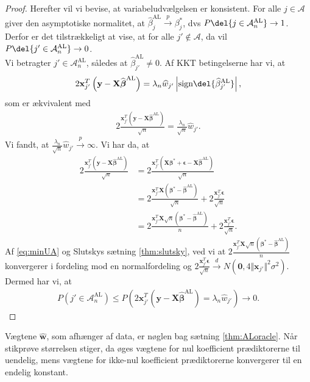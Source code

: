 \begin{proof}
Herefter vil vi bevise, at variabeludvælgelsen er konsistent. For alle $j \in \mathcal{A}$ giver den asymptotiske normalitet, at $\widehat{\beta}_j^{\text{AL}} \overset{p}{\rightarrow}\beta_j^{*}$, dvs $P \del{j \in \mathcal{A}_n^{\text{AL}}} \rightarrow 1$. Derfor er det tilstrækkeligt at vise, at for alle $j' \notin \mathcal{A}$, da vil $P \del{j' \in \mathcal{A}_n^{\text{AL}}} \rightarrow 0$. \\
Vi betragter $j' \in \mathcal{A}_n^{\text{AL}}$, således at $\widehat{\beta}_{j'}^{\text{AL}} \neq 0$. Af KKT betingelserne har vi, at 
\begin{align*}
2 \mathbf{x}_{j'}^T  \left( \mathbf{y}-\mathbf{X}\widehat{\boldsymbol{\beta}}^{\text{AL}} \right)=\lambda_n \widehat{w}_{j'} \left\vert \text{sign} \del{\widehat{\beta}_{j'}^\text{AL}} \right\vert,
\end{align*}
som er ækvivalent med
\begin{align*}
2 \frac{\mathbf{x}_{j'}^T \left( \mathbf{y}-\mathbf{X}\widehat{\boldsymbol{\beta}}^{{\text{AL}}}\right)}{\sqrt{n}}=\frac{\lambda_n}{\sqrt{n}} \widehat{w}_{j'}.
\end{align*}
Vi fandt, at $\frac{\lambda_n}{\sqrt{n}} \widehat{w}_{j'} \overset{p}{\rightarrow} \infty$. Vi har da, at 
\begin{align*}
2 \frac{\mathbf{x}_{j'}^T \left(\mathbf{y}-\mathbf{X}\widehat{\boldsymbol{\beta}}^{{\text{AL}}} \right)}{\sqrt{n}}
 &= 2 \frac{\mathbf{x}_{j'}^T \left(\mathbf{X}\boldsymbol{\beta}^*+\boldsymbol{\epsilon}-\mathbf{X}\widehat{\boldsymbol{\beta}}^{{\text{AL}}} \right) }{\sqrt{n}} \\
&= 2 \frac{\mathbf{x}_{j'}^T \mathbf{X} \left(\boldsymbol{\beta}^*-\widehat{\boldsymbol{\beta}}^{\text{AL}} \right)}{\sqrt{n}}+2\frac{\mathbf{x}_{j'}^T \boldsymbol{\epsilon}}{\sqrt{n}} \\
&= 2 \frac{\mathbf{x}_{j'}^T \mathbf{X} \sqrt{n} \left(\boldsymbol{\beta}^*-\widehat{\boldsymbol{\beta}}^{\text{AL}}\right)}{n}+2\frac{\mathbf{x}_{j'}^T \boldsymbol{\epsilon}}{\sqrt{n}}.
\end{align*}
Af \eqref{eq:minUA} og Slutskys sætning \ref{thm:slutsky}, ved vi at $ 2 \frac{\mathbf{x}_{j'}^T \mathbf{X} \sqrt{n} \left(\boldsymbol{\beta}^*-\widehat{\boldsymbol{\beta}}^{\text{AL}}\right)}{n}$ konvergerer i fordeling mod en normalfordeling og $2\frac{\mathbf{x}_{j'}^T \boldsymbol{\epsilon}}{\sqrt{n}} \overset{d}{\rightarrow} N \left(\mathbf{0}, 4 \Vert \mathbf{x}_{j'} \Vert^2 \sigma^2 \right)$. Dermed har vi, at
\begin{align*}
P\left(j' \in \mathcal{A}_n^{\text{AL}}\right) \leq P\left(2 \mathbf{x}_{j'}^T \left(\mathbf{y}-\mathbf{X} \widehat{\boldsymbol{\beta}}^{\text{AL}}\right)=\lambda_n \widehat{w}_{j'} \right) \rightarrow 0.
\end{align*}
\end{proof}
%
Vægtene \(\widehat{\mathbf{w}}\), som afhænger af data, er nøglen bag sætning \ref{thm:ALoracle}.
Når stikprøve størrelsen stiger, da øges vægtene for nul koefficient prædiktorerne til uendelig, mens vægtene for ikke-nul koefficient prædiktorerne konvergerer til en endelig konstant.
